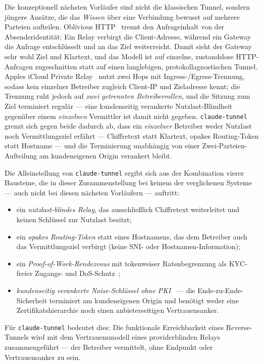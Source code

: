 Die konzeptionell nächsten Vorläufer sind nicht die klassischen Tunnel, sondern
jüngere Ansätze, die das \emph{Wissen} über eine Verbindung bewusst auf mehrere
Parteien aufteilen. Oblivious HTTP~\cite{rfc9458} trennt den Anfrageinhalt von
der Absenderidentität: Ein Relay verbirgt die Client-Adresse, während ein Gateway
die Anfrage entschlüsselt und an das Ziel weiterreicht. Damit sieht der Gateway
sehr wohl Ziel und Klartext, und das Modell ist auf einzelne, zustandslose
HTTP-Anfragen zugeschnitten statt auf einen langlebigen, protokollagnostischen
Tunnel. Apples iCloud Private Relay~\cite{appleprivaterelay} nutzt zwei Hops mit
Ingress-/Egress-Trennung, sodass kein einzelner Betreiber zugleich Client-IP und
Zieladresse kennt; die Trennung ruht jedoch auf \emph{zwei getrennten
Betreiberrollen}, und die Sitzung zum Ziel terminiert regulär --- eine
kundenseitig verankerte Nutzlast-Blindheit gegenüber einem \emph{einzelnen}
Vermittler ist damit nicht gegeben. \texttt{claude-tunnel} grenzt sich gegen
beide dadurch ab, dass ein \emph{einzelner} Betreiber weder Nutzlast noch
Vermittlungsziel erfährt --- Chiffretext statt Klartext, opakes Routing-Token
statt Hostname --- und die Terminierung unabhängig von einer
Zwei-Parteien-Aufteilung am kundeneigenen Origin verankert bleibt.

Die Alleinstellung von \texttt{claude-tunnel} ergibt sich aus der Kombination
vierer Bausteine, die in dieser Zusammenstellung bei keinem der verglichenen
Systeme --- auch nicht bei diesen nächsten Vorläufern --- auftritt:

\begin{itemize}
  \item ein \emph{nutzlast-blindes Relay}, das ausschließlich Chiffretext
    weiterleitet und keinen Schlüssel zur Nutzlast besitzt;
  \item ein \emph{opakes Routing-Token} statt eines Hostnamens, das dem
    Betreiber auch das Vermittlungsziel verbirgt (keine SNI- oder
    Hostnamen-Information);
  \item ein \emph{Proof-of-Work-Rendezvous} mit tokenweiser Ratenbegrenzung als
    KYC-freier Zugangs- und DoS-Schutz~\cite{back2002hashcash};
  \item \emph{kundenseitig verankerte Noise-Schlüssel ohne
    PKI}~\cite{noiseprotocol} --- die Ende-zu-Ende-Sicherheit terminiert am
    kundeneigenen Origin und benötigt weder eine Zertifikatshierarchie noch einen
    anbieterseitigen Vertrauensanker.
\end{itemize}

Für \texttt{claude-tunnel} bedeutet dies: Die funktionale Erreichbarkeit eines
Reverse-Tunnels wird mit dem Vertrauensmodell eines providerblinden Relays
zusammengeführt --- der Betreiber vermittelt, ohne Endpunkt oder Vertrauensanker
zu sein.
